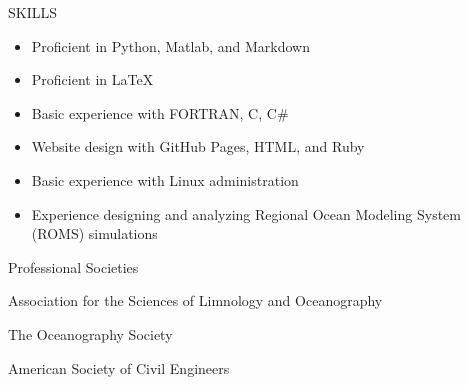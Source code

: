 \documentclass{resume} %
\begin{document}
\begin{rSection}{SKILLS}
\begin{itemize}
    \item Proficient in Python, Matlab, and Markdown
    \item Proficient in \LaTeX
    \item Basic experience with FORTRAN, C, C\#
    \item Website design with GitHub Pages, HTML, and Ruby
    \item Basic experience with Linux administration
    \item Experience designing and analyzing Regional Ocean Modeling System (ROMS) simulations
\end{itemize}
\end{rSection}

\begin{rSection}{Professional Societies} \itemsep -3pt {}
\vspace{-7pt}
\item Association for the Sciences of Limnology and Oceanography
\item The Oceanography Society 
\item American Society of Civil Engineers
\end{rSection}


\end{document}
